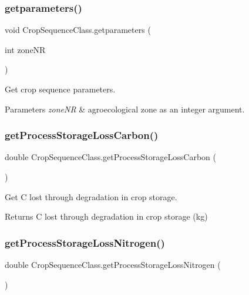 \subsubsection{\texorpdfstring{getparameters()}{getparameters()}}
{\footnotesize\ttfamily void Crop\+Sequence\+Class.\+getparameters (\begin{DoxyParamCaption}\item[{int}]{zone\+NR }\end{DoxyParamCaption})\hspace{0.3cm}{\ttfamily [inline]}}



Get crop sequence parameters. 


\begin{DoxyParams}{Parameters}
{\em zone\+NR} & agroecological zone as an integer argument. \\
\hline
\end{DoxyParams}
\mbox{\label{class_crop_sequence_class_a45d976adcb6e2e1d27255f2207c40eb9}} 
\subsubsection{\texorpdfstring{getProcessStorageLossCarbon()}{getProcessStorageLossCarbon()}}
{\footnotesize\ttfamily double Crop\+Sequence\+Class.\+get\+Process\+Storage\+Loss\+Carbon (\begin{DoxyParamCaption}{ }\end{DoxyParamCaption})\hspace{0.3cm}{\ttfamily [inline]}}



Get C lost through degradation in crop storage. 

\begin{DoxyReturn}{Returns}
C lost through degradation in crop storage (kg) 
\end{DoxyReturn}
\mbox{\label{class_crop_sequence_class_a760f4ab08221d163e5dc1350306d09b7}} 
\subsubsection{\texorpdfstring{getProcessStorageLossNitrogen()}{getProcessStorageLossNitrogen()}}
{\footnotesize\ttfamily double Crop\+Sequence\+Class.\+get\+Process\+Storage\+Loss\+Nitrogen (\begin{DoxyParamCaption}{ }\end{DoxyParamCaption})\hspace{0.3cm}{\ttfamily [inline]}}



